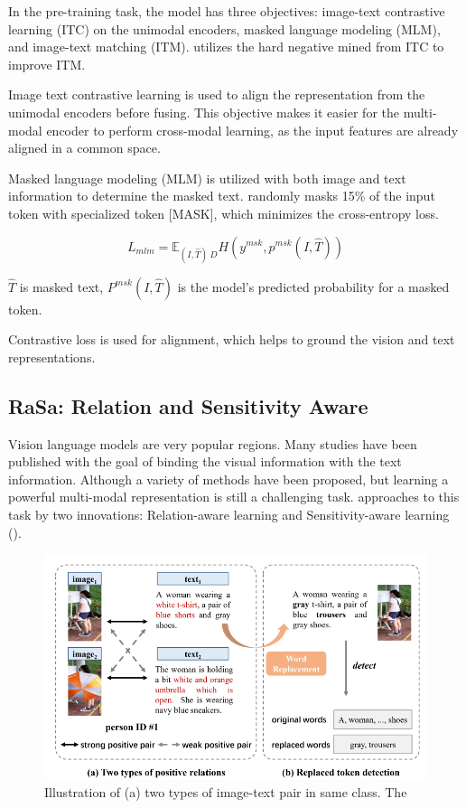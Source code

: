 In the pre-training task, the model has three objectives: image-text contrastive learning (ITC) on the unimodal encoders, masked language modeling (MLM), and image-text matching (ITM).
\cite{li2021align} utilizes the hard negative mined from ITC to improve ITM.

Image text contrastive learning is used to align the representation from the unimodal encoders before fusing. This objective makes it easier for the multi-modal encoder to perform cross-modal learning, as the input features are already aligned in a common space. 

Masked language modeling (MLM) is utilized with both image and text information to determine the masked text. \cite{li2021align} randomly masks 15\% of the input token with specialized token [MASK], which minimizes the cross-entropy loss.

\begin{displaymath}
    L_{mlm} = \mathbb{E}_{(I,\hat{T})~D}H(y^{msk}, p^{msk}(I,\hat{T}))
\end{displaymath}

$\hat{T}$ is masked text, $P^{msk}(I,\hat{T})$ is the model's predicted probability for a masked token. 

Contrastive loss is used for alignment, which helps to ground the vision and text representations.

\subsection{RaSa: Relation and Sensitivity Aware}

Vision language models are very popular regions. Many studies have been published with the goal of binding the visual information with the text information. Although a variety of methods have been proposed, but learning a powerful multi-modal representation is still a challenging task. \cite{Bai2023RaSaRA} approaches to this task by two innovations: Relation-aware learning and Sensitivity-aware learning (\cite{Bai2023RaSaRA}).

\begin{figure}
    \includegraphics[width=\linewidth]{img/weak_positive_relation.png}
    \caption{Illustration of (a) two types of image-text pair in same class. The  }
\end{figure}

